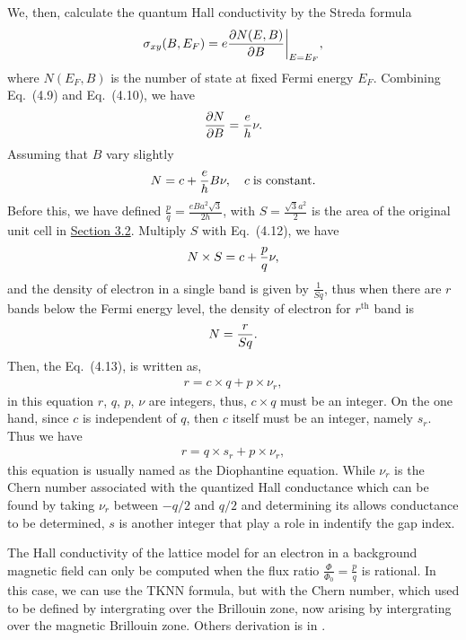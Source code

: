
We, then, calculate the quantum Hall conductivity by the Streda formula \cite{streda1982}
\begin{gather}
\sigma_{xy}(B,E_{F}) = e \dfrac{\partial N (E,B)}{\partial B} \bigg\rvert_{E=E_{F}}^{},
\end{gather}
where $N(E_{F},B)$ is the number of state at fixed Fermi energy $E_{F}$. Combining Eq.~(4.9) and Eq.~(4.10), we have
\begin{gather}
	\dfrac{\partial N}{\partial B} = \dfrac{e}{h} \nu.	
\end{gather}
Assuming that $B$ vary slightly
\begin{gather}
	N = c + \dfrac{e}{h}B \nu, \quad c \; \text{is constant}.
\end{gather}
Before this, we have defined $\frac{p}{q} = \frac{eBa^{2}\sqrt{3}}{2h}$, with $S = \frac{\sqrt{3} a^{2}}{2}$ is the area of the original unit cell in \hyperref[Section 3.2]{Section 3.2}. Multiply $S$ with Eq.~(4.12), we have
\begin{gather}
	N \times S = c + \dfrac{p}{q} \nu,
\end{gather}
and the density of electron in a single band is given by $\frac{1}{Sq}$, thus when there are $r$ bands below the Fermi energy level, the density of electron for $r^{\text{th}}$ band is
\begin{gather}
	N = \dfrac{r}{Sq}.
\end{gather}
Then, the Eq.~(4.13), is written as,
\begin{gather}
	r = c \times q + p \times \nu_{r},
\end{gather}
in this equation $r$, $q$, $p$, $\nu$ are integers, thus, $c\times q$ must be an integer. On the one hand, since $c$ is independent of $q$, then $c$ itself must be an integer, namely $s_{r}$. Thus we have
\begin{gather}
	r = q \times s_{r} + p \times \nu_{r},
\end{gather}
this equation is usually named as the Diophantine equation. While $\nu_{r}$ is the Chern number associated with the quantized Hall conductance which can be found by taking $\nu_{r}$ between $-q/2$ and $q/2$ and determining its allows conductance to be determined, $s$ is another integer that play a role in indentify the gap index.

The Hall conductivity of the lattice model for an electron in a background magnetic field can only be computed when the flux ratio $\frac{\Phi}{\Phi_{0}} = \frac{p}{q}$ is rational. In this case, we can use the TKNN formula, but with the Chern number, which used to be defined by intergrating over the Brillouin zone, now arising by intergrating over the magnetic Brillouin zone. Others derivation is in \cite{di2022linking,dana1985,avron2003}.

